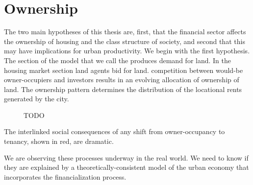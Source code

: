 
\chapter{Ownership} \label{chapter-ownership}

The two main hypotheses of this thesis are, first,  that the financial sector affects the ownership of housing and the class structure of society, and second that this may have implications for urban productivity. We begin with the first hypothesis. The section of the model that we call the produces demand for land. In the housing market section land agents bid for land. competition between would-be owner-occupiers and investors results in an evolving allocation of ownership of land. The ownership pattern determines the distribution of the locational rents generated by the city.

\begin{figure}
\centering
{}
\caption{TODO}
\label{fig:enter-label}
\end{figure}

The interlinked social consequences of any shift from owner-occupancy to tenancy, shown in red, are dramatic. 


We are observing these processes underway in the real world. We need to know if they are explained by a theoretically-consistent model of the urban economy that incorporates the financialization process.

